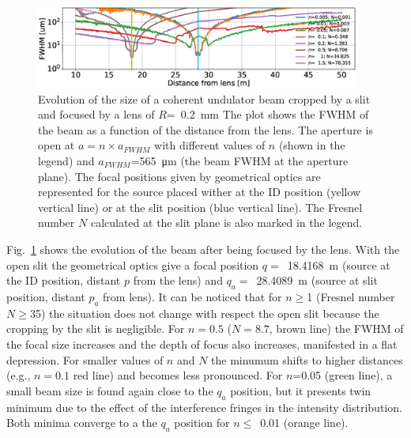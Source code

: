 \documentclass{iucr}              %
\begin{document}
\begin{figure}\label{fig:oneTFund}
    \centering
    \includegraphics[width=0.95\textwidth]{figures/oneTF_UndSource_RectSlit_R200um.eps}

    \caption{Evolution of the size of a coherent undulator beam cropped by a slit and focused by a lens of $R$=~\SI{0.2}{\milli\meter} 
    The plot shows the FWHM of the beam  as a function of the distance from the lens. The aperture is open at $a = n \times a_{FWHM}$ with different values of $n$ (shown in the legend) and $a_{FWHM}$=\SI{565}{\micro\meter} (the beam FWHM at the aperture plane). The focal positions given by geometrical optics are represented for the source placed wither at the ID position (yellow vertical line) or at the slit position (blue vertical line).
    The Fresnel number $N$ calculated at the slit plane is also marked in the legend.
    }
\end{figure}

Fig.~\ref{fig:oneTFund} shows the evolution of the beam after being focused by the lens. With the open slit the geometrical optics give a focal position $q=$~\SI{18.4168}{\meter} (source at the ID position, distant $p$ from the lens) and $q_a=$~\SI{28.4089}{\meter} (source at slit position, distant $p_a$ from lens). It can be noticed that for $n\ge$1 (Fresnel number $N\ge$35) the situation does not change with respect the open slit because the cropping by the slit is negligible. For $n=0.5$ ($N=8.7$, brown line) the FWHM of the focal size increases and the depth of focus also increases, manifested in a flat depression. For smaller values of $n$ and $N$ the minumum shifts to higher distances (e.g., $n=0.1$ red line) and becomes less pronounced. For $n$=0.05 (green line), a small beam size is found again close to the $q_a$ position, but it presents twin minimum due to the effect of the interference fringes in the intensity distribution. Both minima converge to a the $q_a$ position for $n\le$~0.01 (orange line). 
\end{document}
